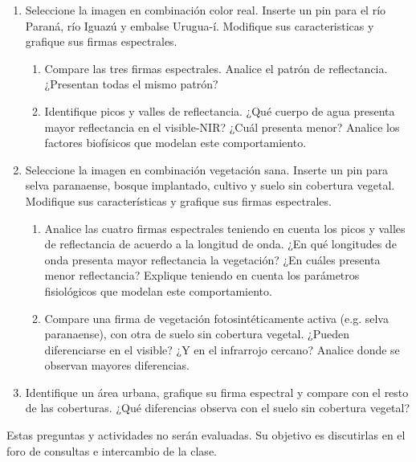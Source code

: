 \begin{enumerate}
  \item Seleccione la imagen en combinación color real. Inserte un pin para el río Paraná, río Iguazú y embalse Urugua-í. Modifique sus caracteristicas y grafique sus firmas espectrales.
  \begin{enumerate}
      \item Compare las tres firmas espectrales. Analice el patrón de reflectancia. ¿Presentan todas el mismo patrón?
      \item Identifique picos y valles de reflectancia. ¿Qué cuerpo de agua presenta mayor reflectancia en el visible-NIR? ¿Cuál presenta menor? Analice los factores biofísicos que modelan este comportamiento.
    \end{enumerate}

  \item Seleccione la imagen en combinación vegetación sana. Inserte un pin para selva paranaense, bosque implantado, cultivo y suelo sin cobertura vegetal. Modifique sus características y grafique sus firmas espectrales.
  \begin{enumerate}
    \item Analice las cuatro firmas espectrales teniendo en cuenta los picos y valles de reflectancia de acuerdo a la longitud de onda. ¿En qué longitudes de onda presenta mayor reflectancia la vegetación? ¿En cuáles presenta menor reflectancia? Explique teniendo en cuenta los parámetros fisiológicos que modelan este comportamiento.
    \item Compare una firma de vegetación fotosintéticamente activa (e.g. selva paranaense), con otra de suelo sin cobertura vegetal. ¿Pueden diferenciarse en el visible? ¿Y en el infrarrojo cercano? Analice donde se observan mayores diferencias.
  \end{enumerate}
	\item Identifique un área urbana, grafique su firma espectral y compare con el resto de las coberturas. ¿Qué diferencias observa con el suelo sin cobertura vegetal? 
  \end{enumerate}

Estas preguntas y actividades no serán evaluadas. Su objetivo es discutirlas en el foro de consultas e intercambio de la clase.

